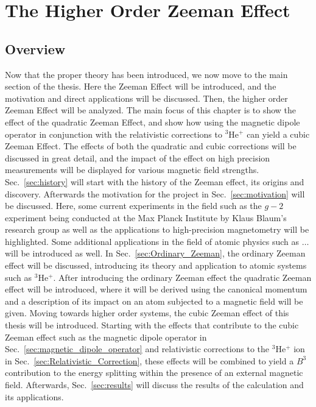 \chapter{The Higher Order Zeeman Effect}\label{sec:Zeeman-Effect}
    \section{Overview}
        Now that the proper theory has been introduced, we now move to the main section of the thesis. Here the Zeeman Effect will be introduced, and the motivation and direct applications will be discussed. Then, the higher order Zeeman Effect will be analyzed. The main focus of this chapter is to show the effect of the quadratic Zeeman Effect, and show how using the magnetic dipole operator in conjunction with the relativistic corrections to $^3$He$^+$ can yield a cubic Zeeman Effect. The effects of both the quadratic and cubic corrections will be discussed in great detail, and the impact of the effect on high precision measurements will be displayed for various magnetic field strengths.\\

       Sec.~\ref{sec:history} will start with the history of the Zeeman effect, its origins and discovery. Afterwards the motivation for the project in Sec.~\ref{sec:motivation} will be discussed. Here, some current experiments in the field such as the $g-2$ experiment being conducted at the Max Planck Institute by Klaus Blaum's research group as well as the applications to high-precision magnetometry will be highlighted. Some additional applications in the field of atomic physics such as $\dots$ will be introduced as well. In Sec.~\ref{sec:Ordinary_Zeeman}, the ordinary Zeeman effect will be discussed, introducing its theory and application to atomic systems such as $^3$He$^+$. After introducing the ordinary Zeeman effect the quadratic Zeeman effect will be introduced, where it will be derived using the canonical momentum and a description of its impact on an atom subjected to a magnetic field will be given. Moving towards higher order systems, the cubic Zeeman effect of this thesis will be introduced. Starting with the effects that contribute to the cubic Zeeman effect such as the magnetic dipole operator in Sec.~\ref{sec:magnetic_dipole_operator} and relativistic corrections to the $^3$He$^+$ ion in Sec.~\ref{sec:Relativistic_Correction}, these effects will be combined to yield a $B^3$ contribution to the energy splitting within the presence of an external magnetic field. Afterwards, Sec.~\ref{sec:results} will discuss the results of the calculation and its applications.
